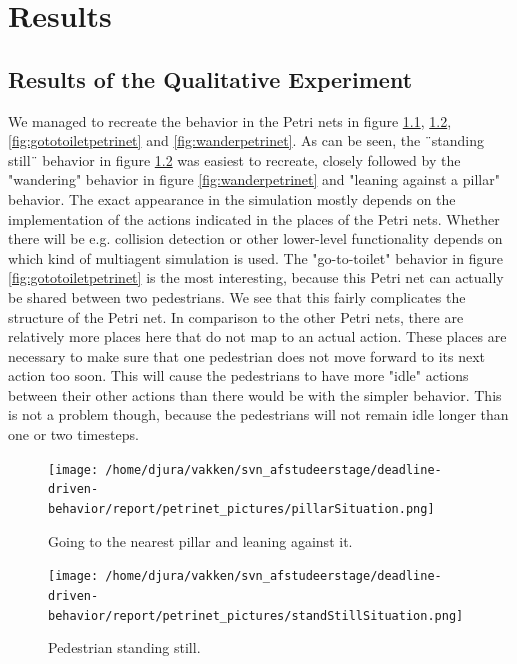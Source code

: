 \documentclass[11pt]{book}
\begin{document}
\chapter{Results}
\label{chap:results}

\section{Results of the Qualitative Experiment}
\label{sec:qualitativeresults}
We managed to recreate the behavior in the Petri nets in figure \ref{fig:pillarpetrinet}, \ref{fig:standstillpetrinet}, \ref{fig:gototoiletpetrinet} and \ref{fig:wanderpetrinet}. As can be seen, the ¨standing still¨ behavior in figure \ref{fig:standstillpetrinet} was easiest to recreate, closely followed by the "wandering" behavior in figure \ref{fig:wanderpetrinet} and "leaning against a pillar" behavior. The exact appearance in the simulation mostly depends on the implementation of the actions indicated in the places of the Petri nets. Whether there will be e.g. collision detection or other lower-level functionality depends on which kind of multiagent simulation is used. The "go-to-toilet" behavior in figure \ref{fig:gototoiletpetrinet} is the most interesting, because this Petri net can actually be shared between two pedestrians. We see that this fairly complicates the structure of the Petri net. In comparison to the other Petri nets, there are relatively more places here that do not map to an actual action. These places are necessary to make sure that one pedestrian does not move forward to its next action too soon. This will cause the pedestrians to have more "idle" actions between their other actions than there would be with the simpler behavior. This is not a problem though, because the pedestrians will not remain idle longer than one or two timesteps.


\begin{figure}
\centering            
\texttt{[image: /home/djura/vakken/svn\_afstudeerstage/deadline-driven-behavior/report/petrinet\_pictures/pillarSituation.png]}
\caption{Going to the nearest pillar and leaning against it.}
\label{fig:pillarpetrinet}
\end{figure}

\begin{figure}
\centering            
\texttt{[image: /home/djura/vakken/svn\_afstudeerstage/deadline-driven-behavior/report/petrinet\_pictures/standStillSituation.png]}
\caption{Pedestrian standing still.}
\label{fig:standstillpetrinet}
\end{figure}
\end{document}
